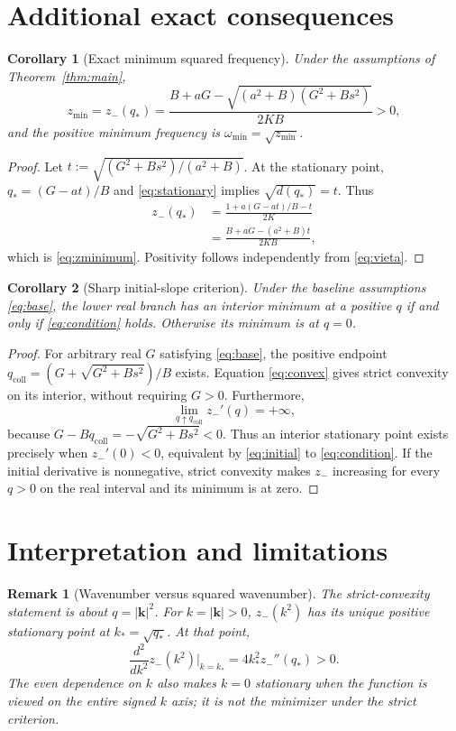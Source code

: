 \documentclass[11pt]{article}
\newtheorem{corollary}{Corollary}
\newtheorem{remark}{Remark}
\begin{document}
\section{Additional exact consequences}
\begin{corollary}[Exact minimum squared frequency]\label{cor:freq}
Under the assumptions of Theorem~\ref{thm:main},
\begin{equation}\label{eq:zminimum}
 \boxed{\displaystyle
 z_{\min}=z_-(q_*)=
 \frac{B+aG-\sqrt{(a^2+B)(G^2+Bs^2)}}{2KB}>0,}
\end{equation}
and the positive minimum frequency is
$\omega_{\min}=\sqrt{z_{\min}}$.
\end{corollary}
\begin{proof}
Let $t:=\sqrt{(G^2+Bs^2)/(a^2+B)}$.
At the stationary point, $q_*=(G-at)/B$ and
\eqref{eq:stationary} implies $\sqrt{d(q_*)}=t$.
Thus
\begin{align*}
 z_-(q_*)
 &=\frac{1+a(G-at)/B-t}{2K}\\
 &=\frac{B+aG-(a^2+B)t}{2KB},
\end{align*}
which is \eqref{eq:zminimum}.  Positivity follows independently from
\eqref{eq:vieta}.
\end{proof}

\begin{corollary}[Sharp initial-slope criterion]
Under the baseline assumptions \eqref{eq:base}, the lower real branch
has an interior minimum at a positive $q$ if and only if
\eqref{eq:condition} holds.  Otherwise its minimum is at $q=0$.
\end{corollary}
\begin{proof}
For arbitrary real $G$ satisfying \eqref{eq:base}, the positive
endpoint $q_{\mathrm{coll}}=(G+\sqrt{G^2+Bs^2})/B$ exists.
Equation \eqref{eq:convex} gives strict convexity on its interior,
without requiring $G>0$.  Furthermore,
\[
 \lim_{q\uparrow q_{\mathrm{coll}}}z_-'(q)=+\infty,
\]
because $G-Bq_{\mathrm{coll}}=-\sqrt{G^2+Bs^2}<0$.
Thus an interior stationary point exists precisely when
$z_-'(0)<0$, equivalent by \eqref{eq:initial} to
\eqref{eq:condition}. If the initial derivative is nonnegative,
strict convexity makes $z_-$ increasing for every $q>0$ on the real
interval and its minimum is at zero.
\end{proof}

\section{Interpretation and limitations}
\begin{remark}[Wavenumber versus squared wavenumber]
The strict-convexity statement is about $q=|\mathbf{k}|^2$.
For $k=|\mathbf{k}|>0$, $z_-(k^2)$ has its unique positive
stationary point at $k_*=\sqrt{q_*}$. At that point,
\[
 \frac{d^2}{dk^2}z_-(k^2)\bigg|_{k=k_*}
 =4k_*^2z_-''(q_*)>0.
\]
The even dependence on $k$ also makes $k=0$ stationary when the
function is viewed on the entire signed $k$ axis; it is not the
minimizer under the strict criterion.
\end{remark}
\end{document}
